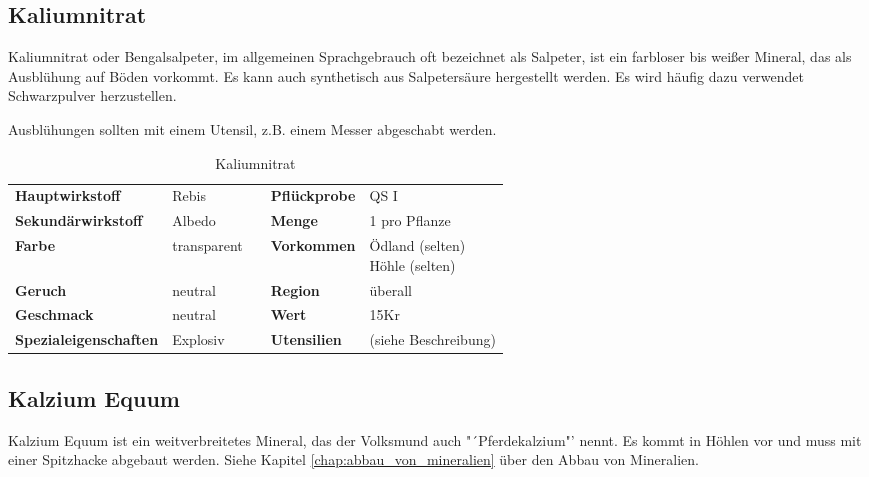 \subsection{Kaliumnitrat}
Kaliumnitrat oder Bengalsalpeter, im allgemeinen Sprachgebrauch oft bezeichnet als Salpeter, ist ein farbloser bis weißer Mineral, das als Ausblühung auf Böden vorkommt. Es kann auch synthetisch aus Salpetersäure hergestellt werden. Es wird häufig dazu verwendet Schwarzpulver herzustellen. 

Ausblühungen sollten mit einem Utensil, z.B. einem Messer abgeschabt werden.

\begin{table}[h] 
\begin{center} 
\begin{tabular}{|l|l|p{1cm}|l|l|} 
  	\cline{1-2} \cline{4-5} 
  	\textbf{Hauptwirkstoff} & Rebis && \textbf{Pflückprobe} & QS I \\ \cline{1-2} \cline{4-5} 
  	\textbf{Sekundärwirkstoff} & Albedo && \textbf{Menge} & 1 pro Pflanze \\ \cline{1-2} \cline{4-5} 
  	\textbf{Farbe} & transparent && \textbf{Vorkommen} & \brcell{Ödland (selten) \\ Höhle (selten)} \\ \cline{1-2} \cline{4-5} 
  	\textbf{Geruch} & neutral && \textbf{Region} & überall \\ \cline{1-2} \cline{4-5} 
  	\textbf{Geschmack} & neutral && \textbf{Wert} & 15Kr \\ \cline{1-2} \cline{4-5} 
  	\textbf{Spezialeigenschaften} & Explosiv && \textbf{Utensilien} & (siehe Beschreibung) \\ \cline{1-2} \cline{4-5} 
\end{tabular} 
\end{center} 
\caption{Kaliumnitrat} 
\label{tab:kaliumnitrat} 
\end{table}


\subsection{Kalzium Equum}
Kalzium Equum ist ein weitverbreitetes Mineral, das der Volksmund auch "´Pferdekalzium"' nennt. Es kommt in Höhlen vor und muss mit einer Spitzhacke abgebaut werden. Siehe Kapitel \ref{chap:abbau_von_mineralien} über den Abbau von Mineralien.

